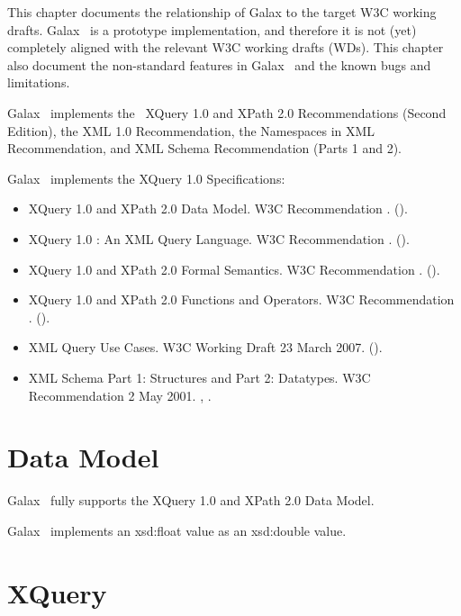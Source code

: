 This chapter documents the relationship of Galax to the target W3C
working drafts. Galax \galaxversion\ is a prototype implementation,
and therefore it is not (yet) completely aligned with the relevant W3C
working drafts (WDs).  This chapter also document the non-standard
features in Galax \galaxversion\ and the known bugs and limitations.

Galax \galaxversion\ implements the \xqueryversion\ XQuery 1.0 and
XPath 2.0 Recommendations (Second Edition), the XML 1.0
Recommendation, the Namespaces in XML Recommendation, and XML Schema
Recommendation (Parts 1 and 2).

Galax \galaxversion\ implements the XQuery 1.0 Specifications:
\begin{itemize}
\item XQuery 1.0 and XPath 2.0 Data Model.
      W3C Recommendation \xqueryrec.
      ().
\item XQuery 1.0 : An XML Query Language.
      W3C Recommendation \xqueryrec.
      ().
\item XQuery 1.0 and XPath 2.0 Formal Semantics.
      W3C Recommendation \xqueryrec.
      ().
\item XQuery 1.0 and XPath 2.0 Functions and Operators.
      W3C Recommendation \xqueryrec.
      ().
\item XML Query Use Cases.
      W3C Working Draft 23 March 2007.
      ().
\item XML Schema Part 1: Structures and Part 2: Datatypes.
      W3C Recommendation 2 May 2001.
      ,
      .
\end{itemize}

\section{Data Model}

Galax \galaxversion\ fully supports the XQuery 1.0 and XPath 2.0 Data
Model.

Galax \galaxversion\ implements an xsd:float value as an xsd:double
value.

\section{XQuery}

